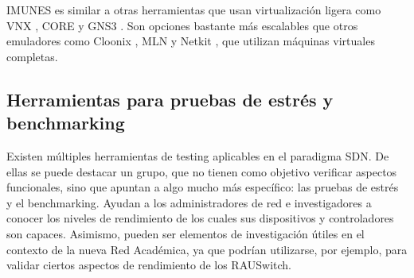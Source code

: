 IMUNES es similar a otras herramientas que usan virtualización ligera como VNX \cite{vnx}, CORE \cite{core} y GNS3 \cite{gns3}. Son opciones bastante más escalables que otros emuladores como Cloonix \cite{cloonix}, MLN \cite{mln} y Netkit \cite{netkit}, que utilizan máquinas virtuales completas.

\subsection{Herramientas para pruebas de estrés y benchmarking}
Existen múltiples herramientas de testing aplicables en el paradigma SDN. De ellas se puede destacar un grupo, que no tienen como objetivo verificar aspectos funcionales, sino que apuntan a algo mucho más específico: las pruebas de estrés y el benchmarking. Ayudan a los administradores de red e investigadores a conocer los niveles de rendimiento de los cuales sus dispositivos y controladores son capaces. Asimismo, pueden ser elementos de investigación útiles en el contexto de la nueva Red Académica, ya que podrían utilizarse, por ejemplo, para validar ciertos aspectos de rendimiento de los RAUSwitch.

